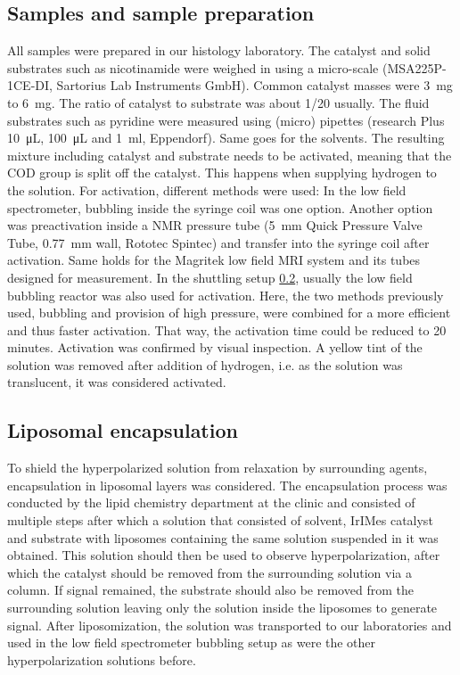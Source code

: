         \subsection{Samples and sample preparation}
        All samples were prepared in our histology laboratory. The catalyst and solid substrates such as nicotinamide were weighed in using a micro-scale (MSA225P-1CE-DI, Sartorius Lab Instruments GmbH). Common catalyst masses were \SI{3}{\milli\gram} to \SI{6}{\milli\gram}. The ratio of catalyst to substrate was about \SI{1/20}{} usually. The fluid substrates such as pyridine were measured using  (micro) pipettes (research Plus \SI{10}{\micro\liter}, \SI{100}{\micro\liter} and \SI{1}{\ml}, Eppendorf). Same goes for the solvents.
        The resulting mixture including catalyst and substrate needs to be activated, meaning that the COD group is split off the catalyst. This happens when supplying hydrogen to the solution. For activation, different methods were used: In the low field spectrometer, bubbling inside the syringe coil was one option. Another option was preactivation inside a NMR pressure tube (\SI{5}{\mm} Quick Pressure Valve Tube, \SI{0.77}{\mm} wall, Rototec Spintec) and transfer into the syringe coil after activation. Same holds for the Magritek low field MRI system and its tubes designed for measurement.
        In the shuttling setup \ref{}, usually the low field bubbling reactor was also used for activation. Here, the two methods previously used, bubbling and provision of high pressure, were combined for a more efficient and thus faster activation. That way, the activation time could be reduced to 20 minutes.
        Activation was confirmed by visual inspection. A yellow tint of the solution was removed after addition of hydrogen, i.e. as the solution was translucent, it was considered activated.
        \subsection{Liposomal encapsulation}
        To shield the hyperpolarized solution from relaxation by surrounding agents, encapsulation in liposomal layers was considered. The encapsulation process was conducted by the lipid chemistry department at the clinic and consisted of multiple steps after which a solution that consisted of solvent, IrIMes catalyst and substrate with liposomes containing the same solution suspended in it was obtained. This solution should then be used to observe hyperpolarization, after which the catalyst should be removed from the surrounding solution via a column. If signal remained, the substrate should also be removed from the surrounding solution leaving only the solution inside the liposomes to generate signal. After liposomization, the solution was transported to our laboratories and used in the low field spectrometer bubbling setup as were the other hyperpolarization solutions before. 
